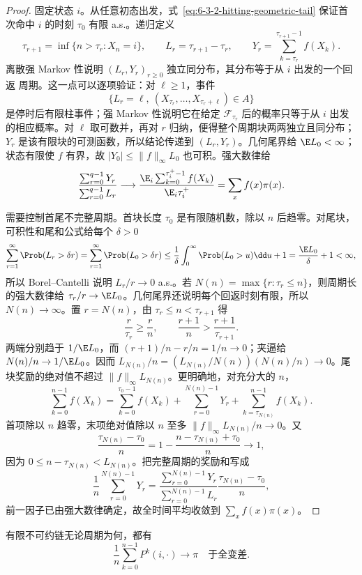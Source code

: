 \begin{proof}
固定状态 $i$。从任意初态出发，式~\eqref{eq:6-3-2-hitting-geometric-tail} 保证首次命中 $i$
的时刻 $\tau_0$ 有限 a.s.。递归定义
\[
 \tau_{r+1}=\inf\{n>\tau_r:X_n=i\},\qquad
 L_r=\tau_{r+1}-\tau_r,
 \qquad
 Y_r=\sum_{k=\tau_r}^{\tau_{r+1}-1}f(X_k).
\]
离散强 Markov 性说明 $(L_r,Y_r)_{r\geq0}$ 独立同分布，其分布等于从 $i$ 出发的一个回返
周期。这一点可以逐项验证：对 $\ell\ge1$，事件
\[
 \{L_r=\ell,\ (X_{\tau_r},\ldots,X_{\tau_r+\ell})\in A\}
\]
是停时后有限柱事件；强 Markov 性说明它在给定 $\mathcal F_{\tau_r}$ 后的概率只等于从
$i$ 出发的相应概率。对 $\ell$ 取可数并，再对 $r$ 归纳，便得整个周期块两两独立且同分布；
$Y_r$ 是该有限块的可测函数，所以结论传递到 $(L_r,Y_r)$。几何尾界给
$\E L_0<\infty$；状态有限使 $f$ 有界，故
$|Y_0|\leq\|f\|_\infty L_0$ 也可积。强大数律给
\[
 \frac{\sum_{r=0}^{q-1}Y_r}{\sum_{r=0}^{q-1}L_r}\longrightarrow
 \frac{\E_i\sum_{k=0}^{\tau_i^+-1}f(X_k)}{\E_i\tau_i^+}
 =\sum_xf(x)\pi(x).
\]

需要控制首尾不完整周期。首块长度 $\tau_0$ 是有限随机数，除以 $n$ 后趋零。对尾块，
可积性和尾和公式给每个 $\delta>0$
\[
 \sum_{r=1}^\infty\Prob(L_r>\delta r)
 =\sum_{r=1}^\infty\Prob(L_0>\delta r)
 \le \frac1\delta\int_0^\infty\Prob(L_0>u)\dd u+1
 =\frac{\E L_0}{\delta}+1<\infty,
\]
所以 Borel--Cantelli 说明 $L_r/r\to0$ a.s.。若
$N(n)=\max\{r:\tau_r\leq n\}$，则周期长的强大数律给
$\tau_r/r\to\E L_0$。几何尾界还说明每个回返时刻有限，所以 $N(n)\to\infty$。置
$r=N(n)$，由 $\tau_r\le n<\tau_{r+1}$ 得
\[
 \frac{r}{\tau_r}\ge\frac r n,
 \qquad
 \frac{r+1}{n}>\frac{r+1}{\tau_{r+1}}.
\]
两端分别趋于 $1/\E L_0$，而 $(r+1)/n-r/n=1/n\to0$；夹逼给
$N(n)/n\to1/\E L_0$。因而
$L_{N(n)}/n=(L_{N(n)}/N(n))(N(n)/n)\to0$。尾块奖励的绝对值不超过
$\|f\|_\infty L_{N(n)}$。更明确地，对充分大的 $n$，
\[
 \sum_{k=0}^{n-1}f(X_k)
 =\sum_{k=0}^{\tau_0-1}f(X_k)
  +\sum_{r=0}^{N(n)-1}Y_r
  +\sum_{k=\tau_{N(n)}}^{n-1}f(X_k).
\]
首项除以 $n$ 趋零，末项绝对值除以 $n$ 至多
$\|f\|_\infty L_{N(n)}/n\to0$。又
\[
 \frac{\tau_{N(n)}-\tau_0}{n}
 =1-\frac{n-\tau_{N(n)}+\tau_0}{n}\longrightarrow1,
\]
因为 $0\le n-\tau_{N(n)}<L_{N(n)}$。把完整周期的奖励和写成
\[
 \frac1n\sum_{r=0}^{N(n)-1}Y_r
 =\frac{\sum_{r=0}^{N(n)-1}Y_r}{\sum_{r=0}^{N(n)-1}L_r}
  \frac{\tau_{N(n)}-\tau_0}{n},
\]
前一因子已由强大数律确定，故全时间平均收敛到 $\sum_xf(x)\pi(x)$。
\end{proof}

\begin{proposition}\label{proposition:6-3-2-5}
有限不可约链无论周期为何，都有
\[
 \frac1n\sum_{k=0}^{n-1}P^k(i,\cdot)\longrightarrow\pi
 \quad\text{于全变差}.
\]
\end{proposition}

